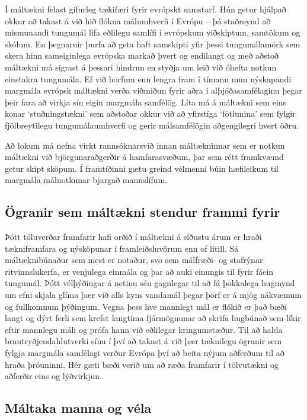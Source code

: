 \documentclass{../../metanetpaper}
\begin{document}
\begin{multicols}{2}
Í máltækni felast gífurleg tækifæri fyrir evrópskt samstarf. Hún getur hjálpað okkur að takast á við hið flókna málumhverfi í Evrópu -- þá staðreynd að mismunandi tungumál lifa eðlilegu samlífi í evrópskum viðskiptum, samtökum og skólum. En þegnarnir þurfa að geta haft samskipti yfir þessi tungumálamörk sem skera hinn sameiginlega evrópska markað þvert og endilangt og með aðstoð máltækni má sigrast á þessari hindrun en styðja um leið við óhefta notkun einstakra tungumála.  
Ef við horfum enn lengra fram í tímann mun nýskapandi margmála evrópsk máltækni verða viðmiðun fyrir aðra í alþjóðasamfélaginu þegar þeir fara að virkja sín eigin margmála samfélög. Líta má á máltækni sem eins konar ‘stuðningstækni’ sem aðstoðar okkur við að yfirstíga ‘fötlunina’ sem fylgir fjölbreytilegu tungumálaumhverfi og gerir málsamfélögin aðgengilegri hvert öðru.

Að lokum má nefna virkt rannsóknarsvið innan máltækninnar sem er notkun máltækni við björgunaraðgerðir á hamfarasvæðum, þar sem rétt framkvæmd getur skipt sköpum. Í framtíðinni gætu greind vélmenni búin hæfileikum til margmála málnotkunar bjargað mannslífum.

\subsection{Ögranir sem máltækni stendur frammi fyrir}

Þótt töluverðar framfarir hafi orðið í máltækni á síðustu árum er hraði tækniframfara og nýsköpunar í framleiðsluvörum enn of lítill. Sá máltæknibúnaður sem mest er notaður, svo sem málfræði- og stafrýnar ritvinnslukerfa, er venjulega einmála og þar að auki einungis til fyrir fáein tungumál. Þótt vélþýðingar á netinu séu gagnlegar til að fá þokkalega hugmynd um efni skjala glíma þær við alls kyns vandamál þegar þörf er á mjög nákvæmum og fullkomnum þýðingum. Vegna þess hve mannlegt mál er flókið er það bæði langt og dýrt ferli sem krefst langtíma fjármögnunar að skrifa hugbúnað sem líkir eftir mannlegu máli og prófa hann við eðlilegar kringumstæður. Til að halda brautryðjendahlutverki sínu í því að takast á við þær tæknilegu ögranir sem fylgja margmála samfélagi verður Evrópa því að beita nýjum aðferðum til að hraða þróuninni. Hér gæti bæði verið um að ræða framfarir í tölvutækni og aðferðir eins og lýðvirkjun.

\subsection{Máltaka manna og véla}


\end{multicols}
\end{document}
